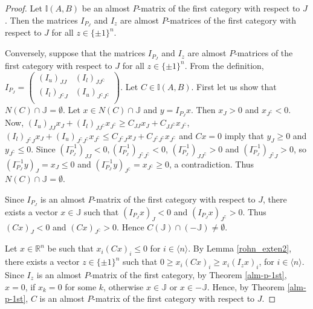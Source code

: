 \documentclass[11pt]{article}
\begin{document}
\begin{proof}
    Let $\mathbb{I}(A,B)$ be an almost $P$-matrix of the first category with respect to $J$.   Then the matrices $I_{P_J}$ and $I_z$ are almost $P$-matrices of the first category with respect to $J$ for all $z\in \{ \pm 1 \}^n$.

    Conversely, suppose that the matrices $I_{P_J}$ and $I_z$ are almost $P$-matrices of the first category with respect to $J$  for all $z\in \{ \pm 1 \}^n$. From the definition, $I_{P_J}=\begin{pmatrix}
            {(I_u)}_{JJ} & {(I_l)}_{J J^\complement} \\
            {(I_l)}_{J^\complement J} & {(I_u)}_{J^\complement  J^\complement}\\
    \end{pmatrix}$. Let $C \in \mathbb{I}(A,B)$. First let us show that $N(C) \cap  \mathbb{J}= \emptyset$. Let $x \in N(C) \cap  \mathbb{J}$ and $y=I_{P_J}x$. Then  $x_J>0$ and $x_{J^\complement}<0$. Now,  $(I_u)_{JJ} x_{J} + (I_l)_{J J^\complement}x_{J^\complement} \geq  C_{JJ} x_{J} + C_{J J^\complement}x_{J^\complement}$, $(I_l)_{J^\complement J} x_{J} + (I_u)_{J^\complement J^\complement}x_{J^\complement} \leq  C_{J^\complement J} x_{J} + C_{J^\complement J^\complement}x_{J^\complement}$ and $Cx=0$ imply that $y_J\geq0$ and $y_{J^\complement}\leq 0$. Since ${(I^{-1}_{P_J})}_{JJ}<0, {(I^{-1}_{P_J})}_{J^\complement J^\complement} < 0$,  ${(I^{-1}_{P_J})}_{JJ^\complement }>0$ and  $ {(I^{-1}_{P_J})}_{J^\complement J }>0$, so ${(I^{-1}_{P_J}y)}_J=x_J\leq  0$ and ${(I^{-1}_{P_J}y)}_{J^\complement}=x_{J^\complement} \geq 0$, a contradiction. Thus $N(C) \cap  \mathbb{J}= \emptyset$.

    Since $I_{P_J}$ is an almost $P$-matrix of the first category with respect to $J$, there exists a vector $x\in \mathbb{J}$ such that ${(I_{P_J}x)}_J<0$ and ${(I_{P_J}x)}_{J^\complement}>0$. Thus ${(Cx)}_J<0$ and ${(Cx)}_{J^\complement}>0$. Hence $C (\mathbb{J}) \cap  (-\mathbb{J}) \neq \emptyset$.

     Let $x \in \mathbb{R}^n$ be  such that $x_i(Cx)_i\leq 0$ for $i \in \langle n \rangle$. By Lemma \ref{rohn_exten2}, there exists a vector $z\in \{ \pm 1 \}^n$ such that $0\geq x_i (C x)_i \geq x_i(I_z x)_i$, for $i\in \langle n \rangle$. Since $I_z$ is an almost $P$-matrix of the first category, by Theorem \ref{alm-p-1st}, $x=0$, if $x_k = 0$ for some $k$,  otherwise $x\in \mathbb{J}$ or $x \in -\mathbb{J}$. Hence, by Theorem \ref{alm-p-1st}, $C$ is an almost $P$-matrix of the first category with respect to $J$.
\end{proof}
\end{document}
